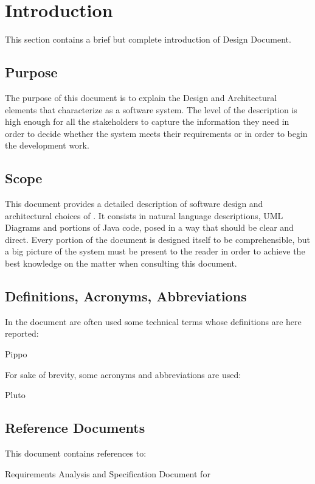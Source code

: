 \section{Introduction}
This section contains a brief but complete introduction of \myTaxiService{} Design Document.
\subsection{Purpose}
The purpose of this document is to explain the Design and Architectural elements that characterize \myTaxiService{} as a software system. The level of the description is high enough for all the stakeholders to capture the information they need in order to decide whether the system meets their requirements or in order to begin the development work.
\subsection{Scope}
This document provides a detailed description of \myTaxiService{} software design and architectural choices of \myTaxiService{}.
It consists in natural language descriptions, UML Diagrams and portions of Java code, posed in a way that should be clear and direct.
Every portion of the document is designed itself to be comprehensible, but a big picture of the system must be present to the reader in order to achieve the best knowledge on the matter when consulting this document.
\subsection{Definitions, Acronyms, Abbreviations}
In the document are often used some technical terms whose definitions are here reported:
\begin{itemize}
	 Pippo
\end{itemize}
For sake of brevity, some acronyms and abbreviations are used:
\begin{itemize}
	 Pluto
\end{itemize}
\subsection{Reference Documents}
This document contains references to:
\begin{itemize}
	  Requirements Analysis and Specification Document for \myTaxiService{}
\end{itemize}

